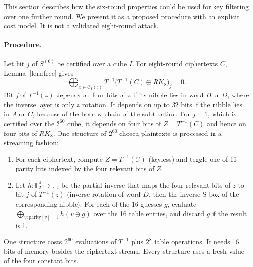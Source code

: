 \documentclass[11pt,a4paper]{article}
\theoremstyle{definition}
\theoremstyle{remark}
\newcommand{\F}{\mathbb{F}_2}
\begin{document}
This section describes how the six-round properties could be used for key filtering over one further round. We present it as a proposed procedure with an explicit cost model. It is not a validated eight-round attack.

\paragraph{Procedure.} Let bit $j$ of $S^{(6)}$ be certified over a cube $I$. For eight-round ciphertexts $C$, Lemma~\ref{lem:free} gives
\[
\bigoplus_{x\in\mathcal C_I(c)} T^{-1}\!\big(T^{-1}(C)\oplus RK_8\big)_j = 0 .
\]
Bit $j$ of $T^{-1}(z)$ depends on four bits of $z$ if its nibble lies in word $B$ or $D$, where the inverse layer is only a rotation. It depends on up to 32 bits if the nibble lies in $A$ or $C$, because of the borrow chain of the subtraction. For $j=1$, which is certified over the $2^{60}$ cube, it depends on four bits of $Z=T^{-1}(C)$ and hence on four bits of $RK_8$. One structure of $2^{60}$ chosen plaintexts is processed in a streaming fashion:
\begin{enumerate}
\item For each ciphertext, compute $Z=T^{-1}(C)$ (keyless) and toggle one of 16 parity bits indexed by the four relevant bits of $Z$.
\item Let $h:\F^4\to\F$ be the partial inverse that maps the four relevant bits of $z$ to bit $j$ of $T^{-1}(z)$ (inverse rotation of word $D$, then the inverse S-box of the corresponding nibble). For each of the 16 guesses $g$, evaluate $\bigoplus_{v:\text{parity}[v]=1} h(v\oplus g)$ over the 16 table entries, and discard $g$ if the result is 1.
\end{enumerate}
One structure costs $2^{60}$ evaluations of $T^{-1}$ plus $2^8$ table operations. It needs 16 bits of memory besides the ciphertext stream. Every structure uses a fresh value of the four constant bits.
\end{document}
